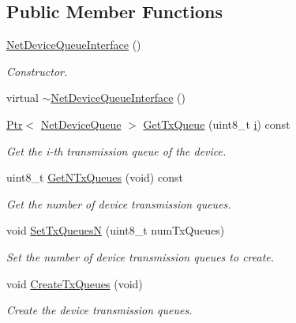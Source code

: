 \subsection*{Public Member Functions}
\begin{DoxyCompactItemize}
\item 
\hyperlink{classns3_1_1NetDeviceQueueInterface_ab54660fb5eccbe4fa4e5bbb35a0898bd}{Net\+Device\+Queue\+Interface} ()
\begin{DoxyCompactList}\small\item\em Constructor. \end{DoxyCompactList}\item 
virtual \hyperlink{classns3_1_1NetDeviceQueueInterface_a01a5aff0b1b0de8c072d9c8e313784ed}{$\sim$\+Net\+Device\+Queue\+Interface} ()
\item 
\hyperlink{classns3_1_1Ptr}{Ptr}$<$ \hyperlink{classns3_1_1NetDeviceQueue}{Net\+Device\+Queue} $>$ \hyperlink{classns3_1_1NetDeviceQueueInterface_a2d644b36d74a7ebb0bb95b0868e09296}{Get\+Tx\+Queue} (uint8\+\_\+t \hyperlink{lte__uplink__power__control_8m_a6f6ccfcf58b31cb6412107d9d5281426}{i}) const 
\begin{DoxyCompactList}\small\item\em Get the i-\/th transmission queue of the device. \end{DoxyCompactList}\item 
uint8\+\_\+t \hyperlink{classns3_1_1NetDeviceQueueInterface_a82b3ee3fe01cad93506ce76138c6c20d}{Get\+N\+Tx\+Queues} (void) const 
\begin{DoxyCompactList}\small\item\em Get the number of device transmission queues. \end{DoxyCompactList}\item 
void \hyperlink{classns3_1_1NetDeviceQueueInterface_a42ef54be93ee4d0ddd9c7dcfc2e6eeb8}{Set\+Tx\+QueuesN} (uint8\+\_\+t num\+Tx\+Queues)
\begin{DoxyCompactList}\small\item\em Set the number of device transmission queues to create. \end{DoxyCompactList}\item 
void \hyperlink{classns3_1_1NetDeviceQueueInterface_ac5322269a36260319e3ff2767c87504f}{Create\+Tx\+Queues} (void)
\begin{DoxyCompactList}\small\item\em Create the device transmission queues. \end{DoxyCompactList}\item 

\end{DoxyCompactItemize}
